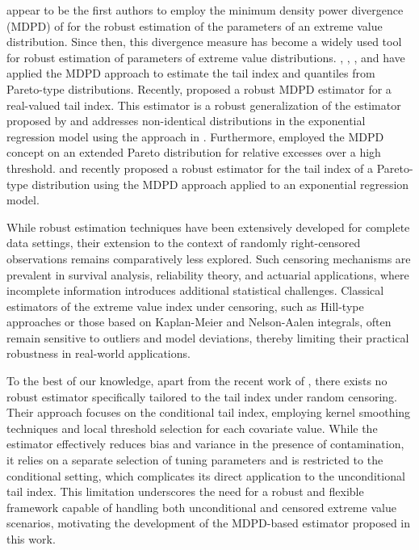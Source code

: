 \documentclass[reqno,openbib,runningheads,a4paper,12pt]{amsart}%
\begin{document}
\noindent\cite{JS2004} appear to be the first authors to employ the minimum
density power divergence (MDPD) of \cite{Basu98} for the robust estimation of
the parameters of an extreme value distribution. Since then, this divergence
measure has become a widely used tool for robust estimation of parameters of
extreme value distributions. \cite{Kim2008}, \cite{DGG13}, \cite{GGV2014}, and
\cite{DGG2021} have applied the MDPD approach to estimate the tail index and
quantiles from Pareto-type distributions. Recently, \cite{Ghosh2017} proposed
a robust MDPD estimator for a real-valued tail index. This estimator is a
robust generalization of the estimator proposed by \cite{MB2003} and addresses
non-identical distributions in the exponential regression model using the
approach in \cite{GB2013}. Furthermore, \cite{DGG13} employed the MDPD concept
on an extended Pareto distribution for relative excesses over a high
threshold. \cite{MWG2023A} and \cite{MWGY2023B} recently proposed a robust
estimator for the tail index of a Pareto-type distribution using the MDPD
approach applied to an exponential regression model.\smallskip

\noindent While robust estimation techniques have been extensively developed
for complete data settings, their extension to the context of randomly
right-censored observations remains comparatively less explored. Such
censoring mechanisms are prevalent in survival analysis, reliability theory,
and actuarial applications, where incomplete information introduces additional
statistical challenges. Classical estimators of the extreme value index under
censoring, such as Hill-type approaches or those based on Kaplan-Meier and
Nelson-Aalen integrals, often remain sensitive to outliers and model
deviations, thereby limiting their practical robustness in real-world
applications.\textbf{\smallskip}

\noindent To the best of our knowledge, apart from the recent work of
\cite{DGG2021}, there exists no robust estimator specifically tailored to the
tail index under random censoring. Their approach focuses on the conditional
tail index, employing kernel smoothing techniques and local threshold
selection for each covariate value. While the estimator effectively reduces
bias and variance in the presence of contamination, it relies on a separate
selection of tuning parameters and is restricted to the conditional setting,
which complicates its direct application to the unconditional tail index. This
limitation underscores the need for a robust and flexible framework capable of
handling both unconditional and censored extreme value scenarios, motivating
the development of the MDPD-based estimator proposed in this work.\smallskip
\end{document}
